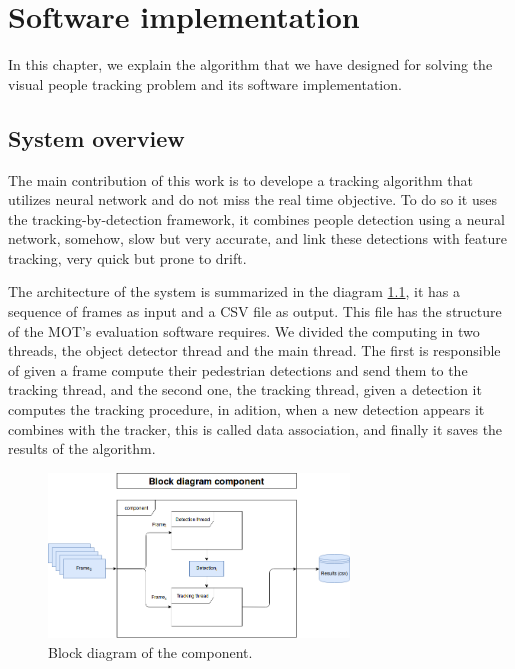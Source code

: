 \chapter{Software implementation}\label{cap.software}

In this chapter, we explain the algorithm that we have designed for solving the visual people tracking problem and its software implementation. 

\section{System overview}

The main contribution of this work is to develope a tracking algorithm that utilizes neural network and do not miss the real time objective. To do so it uses the tracking-by-detection framework, it combines people detection using a neural network, somehow, slow but very accurate, and link these detections with feature tracking, very quick but prone to drift. 

The architecture of the system is summarized in the diagram \ref{software1}, it has a sequence of frames as input and a CSV file as output. This file has the structure of the MOT's evaluation software requires. We divided the computing in two threads, the object detector thread and the main thread. The first is responsible of given a frame compute their pedestrian detections and send them to the tracking thread, and the second one, the tracking thread, given a detection it computes the tracking procedure, in adition, when a new detection appears it combines with the tracker, this is called data association, and finally it saves the results of the algorithm.



\begin{figure}[H]
\centering         
\includegraphics[width=8cm]{flows/bloque.png}
\caption{Block diagram of the component.} \label{software1}
\end{figure}



